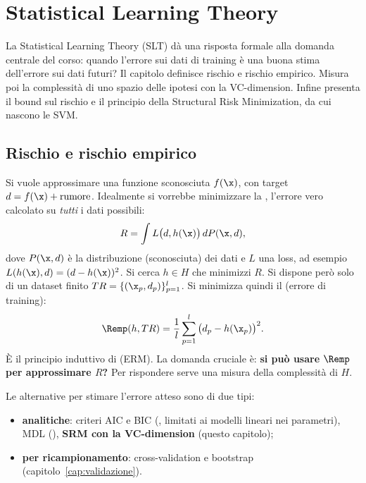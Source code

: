 \chapter{Statistical Learning Theory}
\label{cap:slt}

\begin{inbreve}
La Statistical Learning Theory (SLT) dà una risposta formale alla domanda centrale del corso: quando l'errore
sui dati di training è una buona stima dell'errore sui dati futuri? Il capitolo definisce rischio e rischio
empirico. Misura poi la complessità di uno spazio delle ipotesi con la VC-dimension. Infine presenta il bound sul
rischio e il principio della Structural Risk Minimization, da cui nascono le SVM.
\end{inbreve}

\section{Rischio e rischio empirico}
\label{sec:rischio}

Si vuole approssimare una funzione sconosciuta $f(\x)$, con target $d = f(\x)+\text{rumore}$. Idealmente si
vorrebbe minimizzare la , l'errore vero calcolato su \emph{tutti} i dati possibili:
\begin{equation}\label{eq:rischio}
R = \int L\big(d, h(\x)\big)\,dP(\x,d),
\end{equation}
dove $P(\x,d)$ è la distribuzione (sconosciuta) dei dati e $L$ una loss, ad esempio
$L(h(\x),d) = (d-h(\x))^2$. Si cerca $h\in H$ che minimizzi $R$. Si dispone però solo di un dataset finito
$TR = \{(\x_p,d_p)\}_{p=1}^{l}$. Si minimizza quindi il  (errore di training):
\begin{equation}\label{eq:rischio-empirico}
\Remp(h,TR) = \frac1l\sum_{p=1}^{l}\big(d_p - h(\x_p)\big)^2 .
\end{equation}
È il principio induttivo di  (ERM). La domanda cruciale è:
\textbf{si può usare $\Remp$ per approssimare $R$?} Per rispondere serve una misura della complessità di $H$.

Le alternative per stimare l'errore atteso sono di due tipi:
\begin{itemize}
  \item \textbf{analitiche}: criteri AIC e BIC (, limitati ai
        modelli lineari nei parametri), MDL (), \textbf{SRM con la
        VC-dimension} (questo capitolo);
  \item \textbf{per ricampionamento}: cross-validation e bootstrap (capitolo~\ref{cap:validazione}).
\end{itemize}

